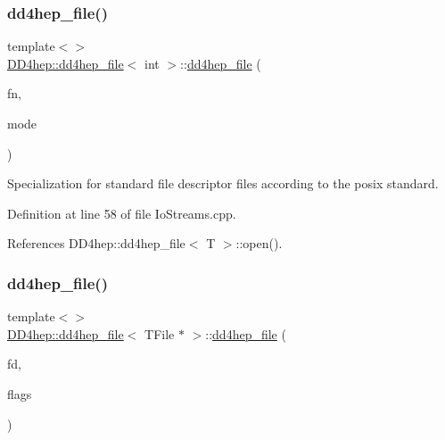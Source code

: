 \subsubsection{\texorpdfstring{dd4hep\+\_\+file()}{dd4hep\_file()}\hspace{0.1cm}{\footnotesize\ttfamily [5/7]}}
{\footnotesize\ttfamily template$<$$>$ \\
\hyperlink{class_d_d4hep_1_1dd4hep__file}{D\+D4hep\+::dd4hep\+\_\+file}$<$ int $>$\+::\hyperlink{class_d_d4hep_1_1dd4hep__file}{dd4hep\+\_\+file} (\begin{DoxyParamCaption}\item[{const char $\ast$}]{fn,  }\item[{B\+O\+O\+S\+T\+\_\+\+I\+O\+S\+::openmode}]{mode }\end{DoxyParamCaption})}



Specialization for standard file descriptor files according to the posix standard. 



Definition at line 58 of file Io\+Streams.\+cpp.



References D\+D4hep\+::dd4hep\+\_\+file$<$ T $>$\+::open().

\hypertarget{class_d_d4hep_1_1dd4hep__file_a3039b0b69b93de966457883bd6893026}{}\label{class_d_d4hep_1_1dd4hep__file_a3039b0b69b93de966457883bd6893026} 
\subsubsection{\texorpdfstring{dd4hep\+\_\+file()}{dd4hep\_file()}\hspace{0.1cm}{\footnotesize\ttfamily [6/7]}}
{\footnotesize\ttfamily template$<$$>$ \\
\hyperlink{class_d_d4hep_1_1dd4hep__file}{D\+D4hep\+::dd4hep\+\_\+file}$<$ T\+File $\ast$ $>$\+::\hyperlink{class_d_d4hep_1_1dd4hep__file}{dd4hep\+\_\+file} (\begin{DoxyParamCaption}\item[{\hyperlink{class_d_d4hep_1_1dd4hep__file_a4d79f8d433cd7831ff818691424cd6fc}{handle\+\_\+type}}]{fd,  }\item[{\hyperlink{namespace_d_d4hep_a31d19f9b0ce567067d2897fbda1761e5}{dd4hep\+\_\+file\+\_\+flags}}]{flags }\end{DoxyParamCaption})}



